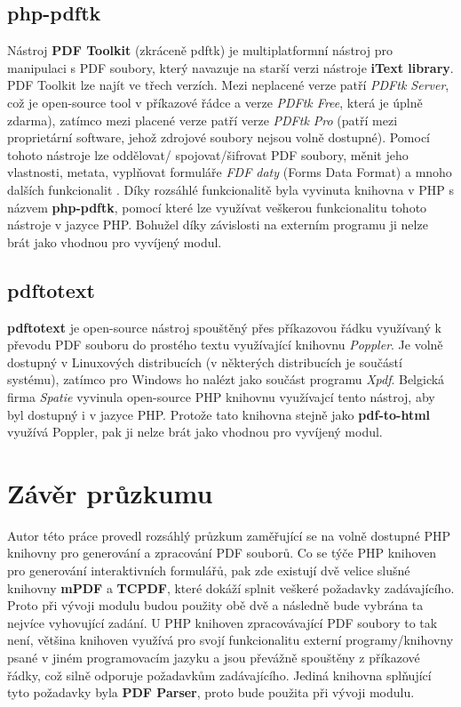 \subsection{php-pdftk}
Nástroj \textbf{PDF Toolkit} (zkráceně pdftk) je multiplatformní nástroj pro manipulaci s PDF soubory, který navazuje na starší verzi nástroje \textbf{iText library}. PDF Toolkit lze najít ve třech verzích. Mezi neplacené verze patří \textit{PDFtk Server}, což je open-source tool v příkazové řádce a verze \textit{PDFtk Free}, která je úplně zdarma), zatímco mezi placené verze patří verze \textit{PDFtk Pro} (patří mezi proprietární software, jehož zdrojové soubory nejsou volně dostupné). Pomocí tohoto nástroje lze oddělovat/ spojovat/šifrovat PDF soubory, měnit jeho vlastnosti, metata, vyplňovat formuláře \textit{FDF daty} (Forms Data Format) a mnoho dalších funkcionalit \cite{phppdftk}. Díky rozsáhlé funkcionalitě byla vyvinuta knihovna v PHP s názvem \textbf{php-pdftk}, pomocí které lze využívat veškerou funkcionalitu tohoto nástroje v jazyce PHP. Bohužel díky závislosti na externím programu ji nelze brát jako vhodnou pro vyvíjený modul.
\subsection{pdftotext}
\textbf{pdftotext} je open-source nástroj spouštěný přes příkazovou řádku využívaný k převodu PDF souboru do prostého textu využívající knihovnu \textit{Poppler}. Je volně dostupný v Linuxových distribucích (v některých distribucích je součástí systému), zatímco pro Windows ho nalézt jako součást programu \textit{Xpdf}. Belgická firma \textit{Spatie} vyvinula open-source PHP knihovnu využívajcí tento nástroj, aby byl dostupný i v jazyce PHP. Protože tato knihovna stejně jako \textbf{pdf-to-html} využívá Poppler, pak ji nelze brát jako vhodnou pro vyvíjený modul.
\section{Závěr průzkumu}
Autor této práce provedl rozsáhlý průzkum zaměřující se na volně dostupné PHP knihovny pro generování a zpracování PDF souborů. Co se týče PHP knihoven pro generování interaktivních formulářů, pak zde existují  dvě velice slušné knihovny \textbf{mPDF} a \textbf{TCPDF}, které dokáží  splnit veškeré požadavky zadávajícího. Proto při vývoji modulu budou použity obě dvě a následně bude vybrána ta nejvíce vyhovující zadání. U PHP knihoven zpracovávající PDF soubory to tak není, většina knihoven využívá pro svojí funkcionalitu externí programy/knihovny psané v jiném programovacím jazyku a jsou převážně spouštěny z příkazové řádky, což silně odporuje požadavkům zadávajícího. Jediná knihovna splňující tyto požadavky byla \textbf{PDF Parser}, proto bude použita při vývoji modulu. 